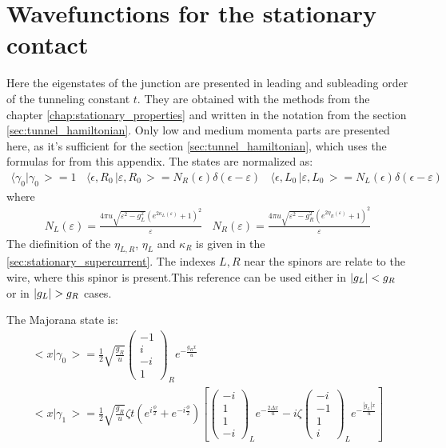 \chapter{Wavefunctions for the stationary contact}
\label{app:wavefunctions_with_corrections}

Here the eigenstates of the junction are presented in leading and subleading order of the tunneling constant $ t $. They are obtained with the methods from the chapter \ref{chap:stationary_properties} and written in the notation from the section \ref{sec:tunnel_hamiltonian}. Only low and medium momenta parts are presented here, as it's sufficient for the section \ref{sec:tunnel_hamiltonian}, which uses the formulas for from this appendix. The states are normalized as:
\begin{gather}
	\big\langle\gamma_{0}\big|\gamma_{0}\,\big>=1
	~~~~
	\big\langle\epsilon,R_{0}\,\big|\varepsilon,R_{0}\,\big>=N_{R}\left(\epsilon\right)\delta\left(\epsilon-\varepsilon\right)
	~~~~
	\big\langle\epsilon,L_{0}\,\big|\varepsilon,L_{0}\,\big>=N_{L}\left(\epsilon\right)\delta\left(\epsilon-\varepsilon\right)
\end{gather}
where
\begin{gather}
	N_{L}\left(\varepsilon\right)=\frac{4\pi u\sqrt{\varepsilon^{2}-g_{L}^{2}}\left(e^{2\ensuremath{\kappa_{L}\left(\varepsilon\right)}}+1\right)^{2}}{\varepsilon}
	~~~~
	N_{R}\left(\varepsilon\right)=\frac{4\pi u\sqrt{\varepsilon^{2}-g_{R}^{2}}\left(e^{2\eta_{R}\left(\varepsilon\right)}+1\right)^{2}}{\varepsilon}
\end{gather}
The diefinition of the $ \eta_{L,R} $, $ \eta_L $ and $ \kappa_R $ is given in the \ref{sec:stationary_supercurrent}. The indexes $ L,R $  near the spinors are relate to the wire, where this spinor is present.This reference can be used either in $ \left|g_{L}\right|<g_{R} $ or in $ \abs{g_{L}}>g_{R} $ cases.

The Majorana state is:
\begin{gather}
	\big<x\big|\gamma_{0}\,\big>=\frac{1}{2}\sqrt{\frac{g_{R}}{u}}\begin{pmatrix}-1\\
	i\\
	-i\\
	1
	\end{pmatrix}_{R}e^{-\frac{g_{R}x}{u}}
	\\
	\big<x\big|\gamma_{1}\,\big>=\frac{1}{2}\sqrt{\frac{g_{R}}{u}}\zeta t\left(e^{i\frac{\phi}{2}}+e^{-i\frac{\phi}{2}}\right)\left[\begin{pmatrix}-i\\
	1\\
	1\\
	-i
	\end{pmatrix}_{L}e^{-\frac{2\Delta x}{u}}-i\zeta\begin{pmatrix}-i\\
	-1\\
	1\\
	i
	\end{pmatrix}_{L}e^{-\frac{\left|g_{L}\right|x}{u}}\right]
\end{gather}


